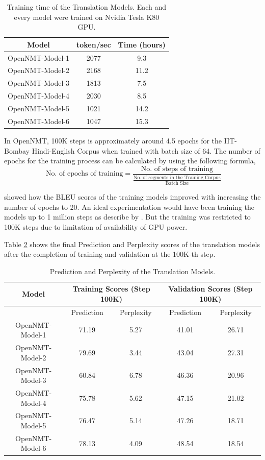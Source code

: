 \begin{table}[h!]
\centering
 \begin{tabular}{ |c|c|c| } 
  \hline Model & token/sec & Time (hours)  \\ 
  \hline  OpenNMT-Model-1 &  2077 & 9.3\\
  OpenNMT-Model-2 & 2168 & 11.2\\
  OpenNMT-Model-3 & 1813 & 7.5 \\
  OpenNMT-Model-4 & 2030 & 8.5 \\
  OpenNMT-Model-5 & 1021 & 14.2 \\
  OpenNMT-Model-6 & 1047 & 15.3 \\
  \hline
 \end{tabular}
\caption{Training time of the Translation Models. Each and every model were trained on Nvidia Tesla K80 GPU.}
\label{bleutable4}
\end{table}

In OpenNMT, 100K steps is approximately around 4.5 epochs for the IIT-Bombay Hindi-English Corpus when trained with batch size of 64. The number of epochs for the training process can be calculated by using the following formula,
\begin{equation*}
   \text{ No. of epochs of training} = \frac{\text{No. of steps of training}}{\frac{\text{No. of segments in the Training Corpus}}{\text{Batch Size}}}
\end{equation*}

\cite{DBLP:journals/corr/abs-1709-05820} showed how the BLEU scores of the training models improved with increasing the number of epochs to 20. An ideal experimentation would have been training the models up to 1 million steps as describe by \cite{45610}. But the training was restricted to 100K steps due to limitation of availability of GPU power. 

Table \ref{bleutable5} shows the final Prediction and Perplexity scores of the translation models after the completion of training and validation at the 100K-th step. 
\begin{table}[h!]
\centering
 \begin{tabular}{ |c|c|c|c|c| } 
  \hline Model & \multicolumn{2}{c|}{Training Scores (Step 100K)}  & \multicolumn{2}{c|}{Validation Scores (Step 100K)}\\ 
  \hline & Prediction & Perplexity & Prediction & Perplexity\\
  \hline  OpenNMT-Model-1 & 71.19 & 5.27 & 41.01 &  26.71 \\
  OpenNMT-Model-2 & 79.69 & 3.44&  43.04 & 27.31\\
  OpenNMT-Model-3 & 60.84 & 6.78&  46.36 & 20.96\\
  OpenNMT-Model-4 & 75.78 & 5.62& 47.15  & 21.02\\
  OpenNMT-Model-5 & 76.47 & 5.14& 47.26  & 18.71\\
  OpenNMT-Model-6 & 78.13 & 4.09& 48.54  & 18.54 \\
  \hline
 \end{tabular}
\caption{Prediction and Perplexity of the Translation Models.}
\label{bleutable5}
\end{table}

